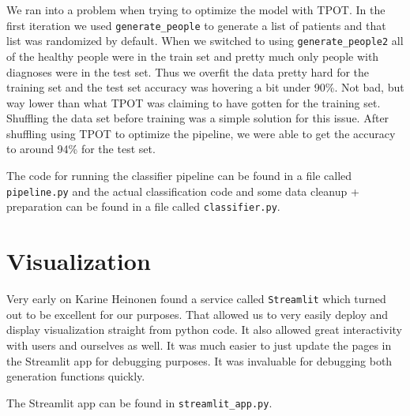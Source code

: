 \documentclass{article}
\begin{document}
We ran into a problem when trying to optimize the model with TPOT. In the first iteration we used \texttt{generate\_people} to generate a list of patients and that list was randomized by default. When we switched to using \texttt{generate\_people2} all of the healthy people were in the train set and pretty much only people with diagnoses were in the test set. Thus we overfit the data pretty hard for the training set and the test set accuracy was hovering a bit under 90\%. Not bad, but way lower than what TPOT was claiming to have gotten for the training set. Shuffling the data set before training was a simple solution for this issue. After shuffling using TPOT to optimize the pipeline, we were able to get the accuracy to around 94\% for the test set.

The code for running the classifier pipeline can be found in a file called \texttt{pipeline.py} and the actual classification code and some data cleanup + preparation can be found in a file called \texttt{classifier.py}.

\section{Visualization}
Very early on Karine Heinonen found a service called \texttt{Streamlit} which turned out to be excellent for our purposes. That allowed us to very easily deploy and display visualization straight from python code. It also allowed great interactivity with users and ourselves as well. It was much easier to just update the pages in the Streamlit app for debugging purposes. It was invaluable for debugging both generation functions quickly. 

The Streamlit app can be found in \texttt{streamlit\_app.py}.
\end{document}
